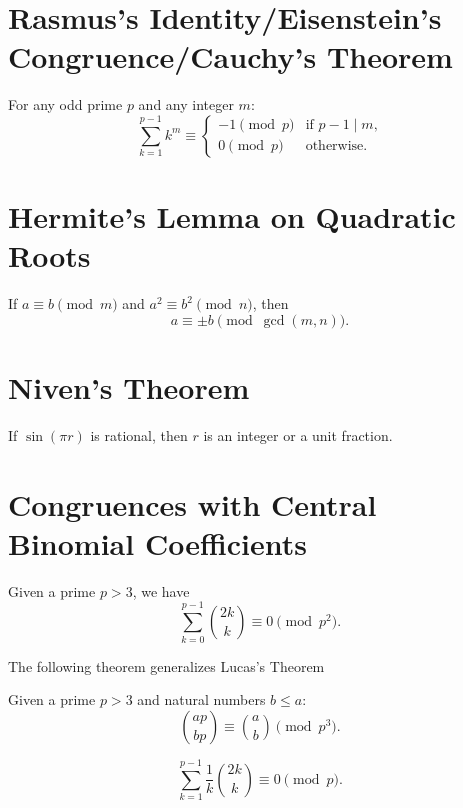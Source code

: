 \section{Rasmus's Identity/Eisenstein's Congruence/Cauchy's Theorem}
For any odd prime $p$ and any integer $m$:
\begin{equation*}
  \sum_{k=1}^{p-1} k^m \equiv
  \begin{cases}
    -1\pmod{p} & \text{if $p-1\mid m$,} \\
    0\pmod{p} & \text{otherwise.}
  \end{cases}
\end{equation*}


\section{Hermite's Lemma on Quadratic Roots}

If $a\equiv b\pmod{m}$ and $a^2\equiv b^2\pmod{n}$, then
\begin{equation*}
  a\equiv\pm b \pmod{\gcd(m,n)}.
\end{equation*}

\section{Niven's Theorem}
If $\sin(\pi r)$ is rational, then $r$ is an integer or a unit fraction.

\section{Congruences with Central Binomial Coefficients}

\begin{theorem}
  Given a prime $p>3$, we have
  \begin{equation*}
    \sum_{k=0}^{p-1}\binom{2k}{k}\equiv 0\pmod{p^2}.
  \end{equation*}
\end{theorem}

The following theorem generalizes Lucas's Theorem

\begin{theorem}[Ljungren]
  Given a prime $p>3$ and natural numbers $b\leq a$:
  \begin{equation*}
    \binom{ap}{bp}\equiv\binom{a}{b}\pmod{p^3}.
  \end{equation*}
\end{theorem}

\begin{theorem}
  \begin{equation*}
      \sum_{k=1}^{p-1}\frac{1}{k}\binom{2k}{k}\equiv 0\pmod{p}.
  \end{equation*}
\end{theorem}


